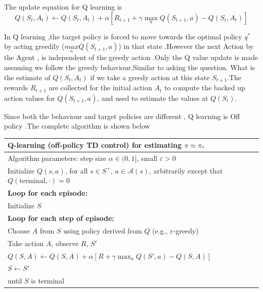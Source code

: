 \documentclass[a4paper,12pt]{Classes/RoboticsLaTeX}
\begin{document}
    The update equation for Q learning is 
     \begin{equation}
     Q(S_t, A_t) \leftarrow Q(S_t, A_t) + \alpha \left[ R_{t+1} + \gamma \max_{a} Q(S_{t+1}, a) - Q(S_t, A_t) \right]
     \end{equation}

     In Q learning ,the target policy is forced  to move towards the optimal policy $q^{*}$  by acting  greedily ($\underset{a}{max} Q({S_{t+1}},a)$) in that state .However the next Action by the Agent , is independent of the greedy action .Only the Q value update is made assuming we follow the greedy behaviour.Similar to asking the question. What is the estimate of $Q({S_t},{A_t})$ if we take a greedy action at this state ${S_{t+1}}$.The  rewards  $R_{t+1}$ are collected  for the initial action ${A_{t}}$ to compute the backed up action values for $Q({S_{t+1}},a)$, and used to estimate the values at $Q({S_t})$.

   Since both the behaviour and target policies are different , Q learning is  Off policy \cite{mnijuNotesQLearning}.The complete algorithm is shown below

   \begin{center}
   \begin{tabular}{|l|}
    \hline
    \textbf{Q-learning (off-policy TD control) for estimating $\pi \approx \pi_*$} \\
    \hline
    Algorithm parameters: step size $\alpha \in (0, 1]$, small $\varepsilon > 0$ \\
    Initialize $Q(s, a)$, for all $s \in S^+$, $a \in \mathcal{A}(s)$, arbitrarily except that $Q(\text{terminal}, \cdot) = 0$ \\
    \textbf{Loop for each episode:} \\
    \hspace{1em} Initialize $S$ \\
    \hspace{1em} \textbf{Loop for each step of episode:} \\
    \hspace{2em} Choose $A$ from $S$ using policy derived from $Q$ (e.g., $\varepsilon$-greedy) \\
    \hspace{2em} Take action $A$, observe $R$, $S'$ \\
    \hspace{2em} $Q(S, A) \leftarrow Q(S, A) + \alpha \left[ R + \gamma \max_{a} Q(S', a) - Q(S, A) \right]$ \\
    \hspace{2em} $S \leftarrow S'$ \\
    \hspace{1em} until $S$ is terminal \\
    \hline
    \end{tabular}
    \end{center}
\end{document}
